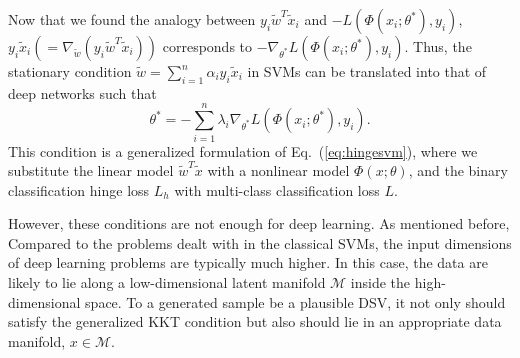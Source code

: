 \begin{table}[t]
  \centering
  \vspace{5mm}
  \caption{}
  \label{table:coreset}
\end{table}


Now that we found the analogy between $y_i\tilde{w}^T\tilde{x}_i$ and $-L(\Phi(x_i; \theta^*), y_i)$, $y_i \tilde{x}_i (=\nabla_{\tilde{w}} (y_i\tilde{w}^T\tilde{x}_i))$ corresponds to $-\nabla_{\theta^*} L(\Phi(x_i; \theta^*), y_i)$. Thus, the stationary condition $\tilde{w} = \sum_{i=1}^n \alpha_i y_i \tilde{x}_i$ in SVMs can be translated into that of deep networks such that
\begin{equation}
\theta^* = - \sum_{i=1}^n \lambda_i \nabla_{\theta^*} L(\Phi(x_i; \theta^*), y_i).
\end{equation}
%
This condition is a generalized formulation of Eq.~(\ref{eq:hingesvm}), where we substitute the linear model $\tilde{w}^T \tilde{x}$ with a nonlinear model $\Phi(x; \theta)$, and the binary classification hinge loss $L_h$ with multi-class classification loss $L$. 


However, these conditions are not enough for deep learning. As mentioned before,  Compared to the problems dealt with in the classical SVMs, the input dimensions of deep learning problems are typically much higher. %
In this case, the data are likely to lie along a low-dimensional latent manifold $\mathcal{M}$ inside the high-dimensional space. %
To  a generated sample be a plausible DSV,  it not only should satisfy the generalized KKT condition but also should lie in an appropriate data manifold, \ie $x \in \mathcal{M}$.


